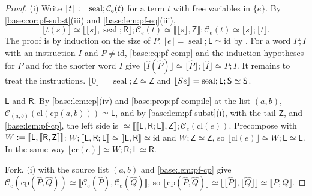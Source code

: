 \begin{proof}
(i) Write $\lfloor t\rfloor\mathrel{:=}\operatorname{seal};\mathcal C_e(t)$ for a
term $t$ with free variables in $\{e\}$.  By \cref{base:cor:pf-subst}(iii)
and \cref{base:lem:pf-eq}(iii),
\begin{equation}
 \lfloor t(s)\rfloor\simeq
 \llbracket\lfloor s\rfloor,\operatorname{seal};\mathsf R\rrbracket;\mathcal C_e(t)
 \simeq\llbracket\lfloor s\rfloor,\mathsf Z\rrbracket;\mathcal C_e(t)
 \simeq\lfloor s\rfloor;\lfloor t\rfloor.
 \label{base:eq:pf-comp}
\end{equation}
The proof is by induction on the size of $P$.  $\lfloor e\rfloor=
\operatorname{seal};\mathsf L\simeq\mathrm{id}$ by .  For a word
$P;I$ with an instruction $I$ and $P\ne\mathrm{id}$, \eqref{base:eq:pf-comp}
and the induction hypotheses for $P$ and for the shorter word $I$ give $\lfloor\widehat I(\widehat P)\rfloor\simeq
\lfloor\widehat P\rfloor;\lfloor\widehat I\rfloor\simeq P;I$.  It remains to
treat the instructions.  $\lfloor 0\rfloor=\operatorname{seal};\mathsf Z
\simeq\mathsf Z$ and $\lfloor S e\rfloor=\operatorname{seal};\mathsf L;\mathsf S
\simeq\mathsf S$.

$\mathsf L$ and $\mathsf R$.  By \cref{base:lem:cp}(iv) and
\cref{base:prop:pf-compile} at the list $(a,b)$,
$\mathcal C_{(a,b)}(\mathrm{cl}(\mathrm{cp}(a,b)))\simeq\mathsf L$, and by
\cref{base:lem:pf-subst}(i), with the tail $\mathsf Z$, and
\cref{base:lem:pf-cp}, the left side is
$\simeq\llbracket\llbracket\mathsf L,\mathsf R;\mathsf L\rrbracket,\mathsf Z\rrbracket;
\mathcal C_e(\mathrm{cl}(e))$.  Precompose with
$W\mathrel{:=}[\![\mathsf L,[\![\mathsf R,\mathsf Z]\!]]\!]$:
$W;\llbracket\mathsf L,\mathsf R;\mathsf L\rrbracket\simeq
\llbracket\mathsf L,\mathsf R\rrbracket\simeq\mathrm{id}$ and
$W;\mathsf Z\simeq\mathsf Z$, so $\lfloor\mathrm{cl}(e)\rfloor\simeq
W;\mathsf L\simeq\mathsf L$.  In the same way
$\lfloor\mathrm{cr}(e)\rfloor\simeq W;\mathsf R;\mathsf L\simeq\mathsf R$.

Fork.  (i) with the source list $(a,b)$ and
\cref{base:lem:pf-cp} give
$\mathcal C_e(\mathrm{cp}(\widehat P,\widehat Q))\simeq
\llbracket\mathcal C_e(\widehat P),\mathcal C_e(\widehat Q)\rrbracket$, so
$\lfloor\mathrm{cp}(\widehat P,\widehat Q)\rfloor\simeq
\llbracket\lfloor\widehat P\rfloor,\lfloor\widehat Q\rfloor\rrbracket\simeq
\llbracket P,Q\rrbracket$.


\end{proof}
